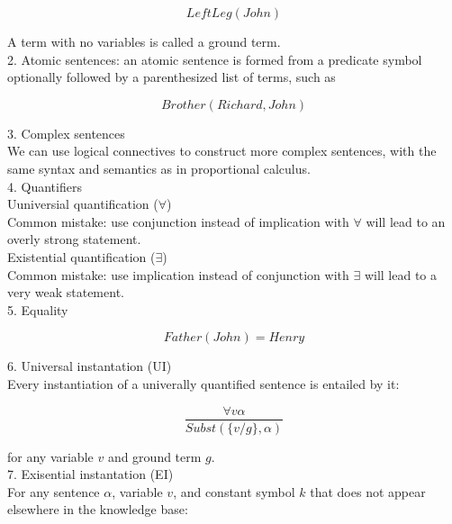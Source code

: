 \documentclass[12pt]{article}
\begin{document}
\begin{equation*}
  LeftLeg(John)
\end{equation*}

A term with no variables is called a ground term. \\

2. Atomic sentences: an atomic sentence is formed from a predicate symbol optionally followed by a parenthesized list of terms, such as

\begin{equation*}
  Brother(Richard, John)
\end{equation*}

3. Complex sentences \\

We can use logical connectives to construct more complex sentences, with the same syntax and semantics as in proportional calculus. \\

4. Quantifiers \\

Uuniversial quantification ($\forall$) \\
Common mistake: use conjunction instead of implication with $\forall$ will lead to an overly strong statement.  \\

Existential quantification ($\exists$) \\
Common mistake: use implication instead of conjunction with $\exists$ will lead to a very weak statement. \\

5. Equality

\begin{equation*}
  Father(John) = Henry
\end{equation*}

6. Universal instantation (UI) \\

Every instantiation of a univerally quantified sentence is entailed by it:

\begin{equation*}
  \frac {\forall v \alpha}{Subst(\{v/g\}, \alpha)}
\end{equation*}

for any variable $v$ and ground term $g$. \\

7. Exisential instantation (EI) \\

For any sentence $\alpha$, variable $v$, and constant symbol $k$ that does not appear elsewhere in the knowledge base:
\end{document}
